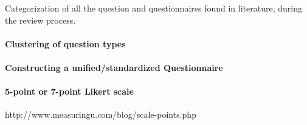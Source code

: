 	Categorization of all the question and questionnaires found in literature, during the review process.

	\paragraph{Clustering of question types}

	\paragraph{Constructing a unified/standardized Questionnaire}

	\paragraph{5-point or 7-point Likert scale}
	http://www.measuringu.com/blog/scale-points.php





		\label{table:ASDFTODO}


